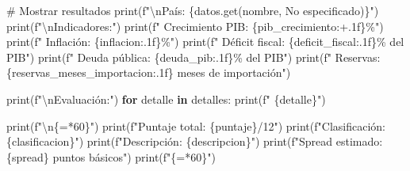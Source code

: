 \documentclass[
  doc,
  floatsintext,
  longtable,
  a4paper,
  nolmodern,
  notxfonts,
  notimes,
  12pt,
  colorlinks=true,linkcolor=blue,citecolor=blue,urlcolor=blue]{apa7}
\newenvironment{Shaded}{\begin{snugshade}}{\end{snugshade}}
\newcommand{\BuiltInTok}[1]{\textcolor[rgb]{0.00,0.23,0.31}{#1}}
\newcommand{\CharTok}[1]{\textcolor[rgb]{0.13,0.47,0.30}{#1}}
\newcommand{\CommentTok}[1]{\textcolor[rgb]{0.37,0.37,0.37}{#1}}
\newcommand{\ControlFlowTok}[1]{\textcolor[rgb]{0.00,0.23,0.31}{\textbf{#1}}}
\newcommand{\DecValTok}[1]{\textcolor[rgb]{0.68,0.00,0.00}{#1}}
\newcommand{\KeywordTok}[1]{\textcolor[rgb]{0.00,0.23,0.31}{\textbf{#1}}}
\newcommand{\NormalTok}[1]{\textcolor[rgb]{0.00,0.23,0.31}{#1}}
\newcommand{\OperatorTok}[1]{\textcolor[rgb]{0.37,0.37,0.37}{#1}}
\newcommand{\SpecialCharTok}[1]{\textcolor[rgb]{0.37,0.37,0.37}{#1}}
\newcommand{\SpecialStringTok}[1]{\textcolor[rgb]{0.13,0.47,0.30}{#1}}
\newcommand{\StringTok}[1]{\textcolor[rgb]{0.13,0.47,0.30}{#1}}
\begin{document}
\begin{Shaded}
\begin{Highlighting}[]
        \CommentTok{\# Mostrar resultados}
        \BuiltInTok{print}\NormalTok{(}\SpecialStringTok{f"}\CharTok{\textbackslash{}n}\SpecialStringTok{País: }\SpecialCharTok{\{}\NormalTok{datos}\SpecialCharTok{.}\NormalTok{get(}\StringTok{\textquotesingle{}nombre\textquotesingle{}}\NormalTok{, }\StringTok{\textquotesingle{}No especificado\textquotesingle{}}\NormalTok{)}\SpecialCharTok{\}}\SpecialStringTok{"}\NormalTok{)}
        \BuiltInTok{print}\NormalTok{(}\SpecialStringTok{f"}\CharTok{\textbackslash{}n}\SpecialStringTok{Indicadores:"}\NormalTok{)}
        \BuiltInTok{print}\NormalTok{(}\SpecialStringTok{f"  Crecimiento PIB: }\SpecialCharTok{\{}\NormalTok{pib\_crecimiento}\SpecialCharTok{:+.1f\}}\SpecialStringTok{\%"}\NormalTok{)}
        \BuiltInTok{print}\NormalTok{(}\SpecialStringTok{f"  Inflación: }\SpecialCharTok{\{}\NormalTok{inflacion}\SpecialCharTok{:.1f\}}\SpecialStringTok{\%"}\NormalTok{)}
        \BuiltInTok{print}\NormalTok{(}\SpecialStringTok{f"  Déficit fiscal: }\SpecialCharTok{\{}\NormalTok{deficit\_fiscal}\SpecialCharTok{:.1f\}}\SpecialStringTok{\% del PIB"}\NormalTok{)}
        \BuiltInTok{print}\NormalTok{(}\SpecialStringTok{f"  Deuda pública: }\SpecialCharTok{\{}\NormalTok{deuda\_pib}\SpecialCharTok{:.1f\}}\SpecialStringTok{\% del PIB"}\NormalTok{)}
        \BuiltInTok{print}\NormalTok{(}\SpecialStringTok{f"  Reservas: }\SpecialCharTok{\{}\NormalTok{reservas\_meses\_importacion}\SpecialCharTok{:.1f\}}\SpecialStringTok{ meses de importación"}\NormalTok{)}
        
        \BuiltInTok{print}\NormalTok{(}\SpecialStringTok{f"}\CharTok{\textbackslash{}n}\SpecialStringTok{Evaluación:"}\NormalTok{)}
        \ControlFlowTok{for}\NormalTok{ detalle }\KeywordTok{in}\NormalTok{ detalles:}
            \BuiltInTok{print}\NormalTok{(}\SpecialStringTok{f"  }\SpecialCharTok{\{}\NormalTok{detalle}\SpecialCharTok{\}}\SpecialStringTok{"}\NormalTok{)}
        
        \BuiltInTok{print}\NormalTok{(}\SpecialStringTok{f"}\CharTok{\textbackslash{}n}\SpecialCharTok{\{}\StringTok{\textquotesingle{}=\textquotesingle{}}\OperatorTok{*}\DecValTok{60}\SpecialCharTok{\}}\SpecialStringTok{"}\NormalTok{)}
        \BuiltInTok{print}\NormalTok{(}\SpecialStringTok{f"Puntaje total: }\SpecialCharTok{\{}\NormalTok{puntaje}\SpecialCharTok{\}}\SpecialStringTok{/12"}\NormalTok{)}
        \BuiltInTok{print}\NormalTok{(}\SpecialStringTok{f"Clasificación: }\SpecialCharTok{\{}\NormalTok{clasificacion}\SpecialCharTok{\}}\SpecialStringTok{"}\NormalTok{)}
        \BuiltInTok{print}\NormalTok{(}\SpecialStringTok{f"Descripción: }\SpecialCharTok{\{}\NormalTok{descripcion}\SpecialCharTok{\}}\SpecialStringTok{"}\NormalTok{)}
        \BuiltInTok{print}\NormalTok{(}\SpecialStringTok{f"Spread estimado: }\SpecialCharTok{\{}\NormalTok{spread}\SpecialCharTok{\}}\SpecialStringTok{ puntos básicos"}\NormalTok{)}
        \BuiltInTok{print}\NormalTok{(}\SpecialStringTok{f"}\SpecialCharTok{\{}\StringTok{\textquotesingle{}=\textquotesingle{}}\OperatorTok{*}\DecValTok{60}\SpecialCharTok{\}}\SpecialStringTok{"}\NormalTok{)}
        

\end{Highlighting}
\end{Shaded}
\end{document}
